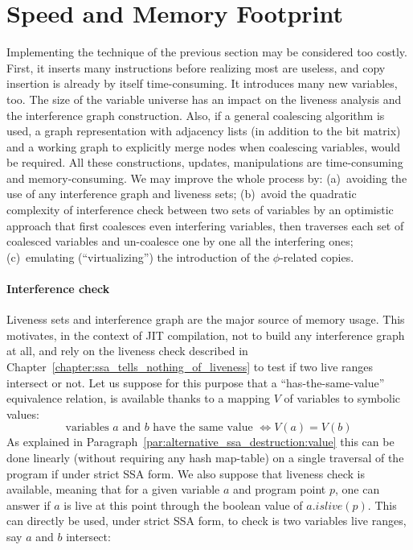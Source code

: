 \section{Speed and Memory Footprint}
Implementing the technique of the previous section may be considered too costly. 
First, it inserts many instructions before realizing most are useless, and copy insertion is already by itself time-consuming. 
It introduces many new variables, too. 
The size of the variable universe has an impact on the liveness analysis and the interference graph construction. 
Also, if a general coalescing algorithm is used, a graph representation with adjacency lists (in addition to the bit matrix) and a working graph to explicitly merge nodes when coalescing variables, would be required. 
All these constructions, updates, manipulations are time-consuming and memory-consuming. 
We may improve the whole process by: 
(a)~avoiding the use of any interference graph and liveness sets; 
(b)~avoid the quadratic complexity of interference check between two sets of variables by an optimistic approach that first coalesces even interfering variables, then traverses each set of coalesced variables and un-coalesce one by one all the interfering ones; 
(c)~emulating (``virtualizing'') the introduction of the $\phi$-related copies.

\paragraph{Interference check}
Liveness sets and interference graph are the major source of memory usage. 
This motivates, in the context of JIT compilation, not to build any interference graph at all, and rely on the liveness check described in Chapter~\ref{chapter:ssa_tells_nothing_of_liveness} to test if two live ranges intersect or not. 
Let us suppose for this purpose that a ``has-the-same-value'' equivalence relation, is available thanks to a mapping $V$ of variables to symbolic values: 
\\
$$\textrm{variables }a\textrm{ and }b\textrm{ have the same value } \Leftrightarrow V(a)=V(b)$$
As explained in Paragraph~\ref{par:alternative_ssa_destruction:value} this can be done linearly (without requiring any hash map-table) on a single traversal of the program if under strict SSA form. 
We also suppose that liveness check is available, meaning that for a given variable $a$ and program point $p$, one can answer if $a$ is live at this point through the boolean value of  $a.\textit{islive}(p)$. This can directly be used, under strict SSA form, to check is two variables live ranges, say $a$ and $b$ intersect:

